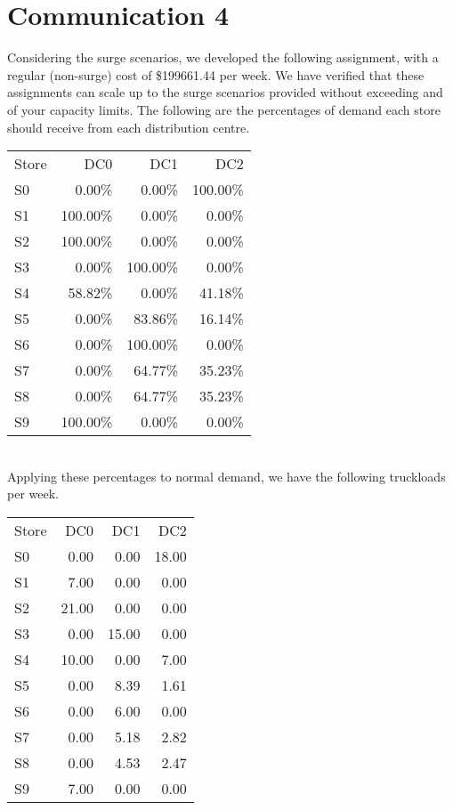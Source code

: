 \documentclass[11pt,a4paper]{article}
\begin{document}
\section{Communication 4}
Considering the surge scenarios, we developed the following assignment, with a 
regular (non-surge) cost of \$199661.44 per week.
We have verified that these assignments can scale up to the surge scenarios provided
without exceeding and of your capacity limits.
The following are the percentages of demand each store should receive 
from each distribution centre. \\[0.8em]
\begin{tabular}{l r r r}
    Store & DC0 & DC1 & DC2 \\
S0 & 0.00\% & 0.00\% & 100.00\% \\
S1 & 100.00\% & 0.00\% & 0.00\% \\
S2 & 100.00\% & 0.00\% & 0.00\% \\
S3 & 0.00\% & 100.00\% & 0.00\% \\
S4 & 58.82\% & 0.00\% & 41.18\% \\
S5 & 0.00\% & 83.86\% & 16.14\% \\
S6 & 0.00\% & 100.00\% & 0.00\% \\
S7 & 0.00\% & 64.77\% & 35.23\% \\
S8 & 0.00\% & 64.77\% & 35.23\% \\
S9 & 100.00\% & 0.00\% & 0.00\% \\
\end{tabular}\\
Applying these percentages to normal demand, we have the following truckloads per 
week. \\[0.8em]
\begin{tabular}{l r r r }
    Store & DC0 & DC1 & DC2 \\
S0 & 0.00 & 0.00 & 18.00 \\
S1 & 7.00 & 0.00 & 0.00 \\
S2 & 21.00 & 0.00 & 0.00 \\
S3 & 0.00 & 15.00 & 0.00 \\
S4 & 10.00 & 0.00 & 7.00 \\
S5 & 0.00 & 8.39 & 1.61 \\
S6 & 0.00 & 6.00 & 0.00 \\
S7 & 0.00 & 5.18 & 2.82 \\
S8 & 0.00 & 4.53 & 2.47 \\
S9 & 7.00 & 0.00 & 0.00 \\
\end{tabular}
\end{document}
